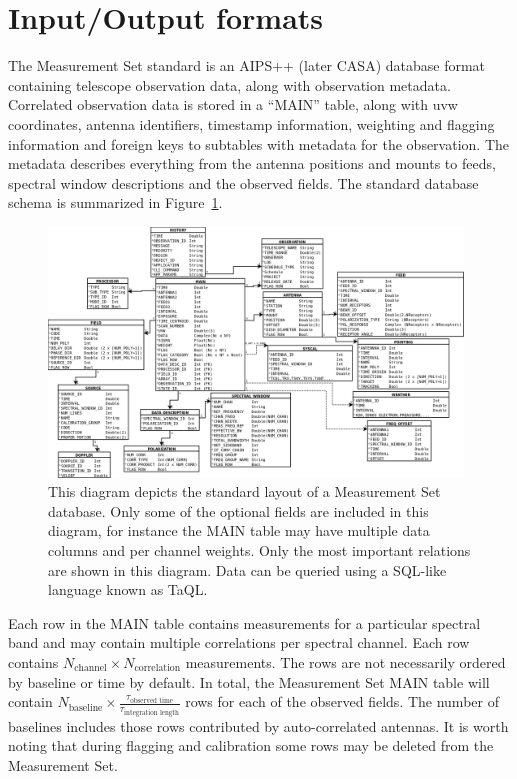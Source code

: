 \section{Input/Output formats}
The Measurement Set standard \cite{ms10,ms20} is an AIPS++ (later CASA) database format containing telescope observation data, 
along with observation metadata. Correlated observation data is stored in a ``MAIN'' table, along with uvw coordinates, antenna identifiers, 
timestamp information, weighting and flagging information and foreign keys to subtables with metadata for the observation. The 
metadata describes everything from the antenna positions and mounts to feeds, spectral window descriptions and the observed fields. The
standard database schema is summarized in Figure~\ref{FIG_MS_RELATIONS}.
\begin{figure}[ht!]
 \begin{mdframed}
  \centering
  \includegraphics[height=0.45\textheight,width=0.98\textwidth]{images/ms_relations.png}
  \caption[Measurement Set schema]{This diagram depicts the standard layout of a Measurement Set database. Only some of the optional fields
  are included in this diagram, for instance the MAIN table may have multiple data columns and per channel weights. Only the most important
  relations are shown in this diagram. Data can be queried using a SQL-like language known as TaQL.}
  \label{FIG_MS_RELATIONS}
 \end{mdframed}
\end{figure}

Each row in the MAIN table contains measurements for a particular spectral band and may contain multiple correlations per spectral channel. Each
row contains $N_\text{channel}\times N_\text{correlation}$ measurements. The rows are not necessarily 
ordered by baseline or time by default. In total, the Measurement Set MAIN table
will contain $N_\text{baseline}\times \frac{\tau_\text{observed time}}{\tau_\text{integration length}}$ rows for each of the observed fields. The
number of baselines includes those rows contributed by auto-correlated antennas. It is worth noting that during flagging and calibration some 
rows may be deleted from the Measurement Set.

